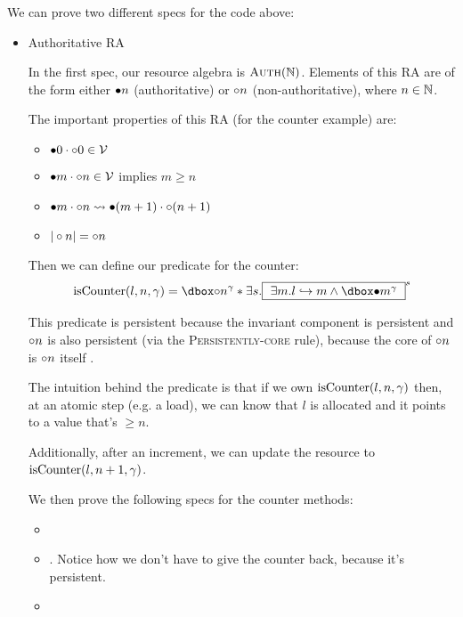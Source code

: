 We can prove two different specs for the code above:
\begin{itemize}
\item Authoritative RA

In the first spec, our resource algebra is $\textsc{Auth}(\mathbb{N})$. Elements of this RA are of the form either $\bullet n$ (authoritative) or $\circ n$ (non-authoritative), where $n \in \mathbb{N}$.

The important properties of this RA (for the counter example) are:
\begin{itemize}
\item $\bullet 0 \cdot \circ 0 \in \mathcal{V}$
\item $\bullet m \cdot \circ n \in \mathcal{V}$ implies $m \ge n$
\item $\bullet m \cdot \circ n \rightsquigarrow \bullet (m + 1) \cdot \circ (n + 1)$
\item $|\circ n| = \circ n$
\end{itemize}

Then we can define our predicate for the counter:
\[ \isCounter{l}{n}{\gamma} = \ownr{\naelem{n}} {\gamma} * \exists s.\inv{ $\exists m. \pointsto{l}{m} \land \ownr{\aelem{m}}{\gamma} $ }{s} \]

This predicate is persistent because the invariant component is persistent and $\circ n$ is also persistent (via the \textsc{Persistently-core} rule), because the core of $\circ n$ is $\circ n$ itself .

The intuition behind the predicate is that if we own $\text{isCounter}(l, n, \gamma)$ then, at an atomic step (e.g. a load), we can know that $l$ is allocated and it points to a value that's $\ge n$.

Additionally, after an increment, we can update the resource to $\text{isCounter}(l, n + 1, \gamma)$.

We then prove the following specs for the counter methods:
\begin{itemize}
\item {}
\item {}. Notice how we don't have to give the counter back, because it's persistent.
\item {}
\end{itemize}


\end{itemize}
